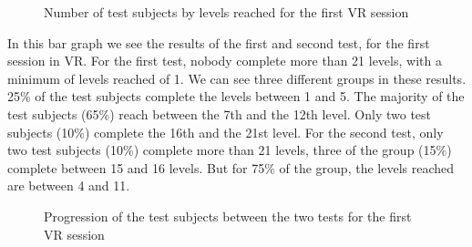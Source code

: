 \documentclass[12pt, openany, twocolumn]{article}
\begin{document}
                \begin{figure}[H]
                    \setlength{\fboxsep}{0pt}
                    \setlength{\fboxrule}{1pt}
                    \caption{Number of test subjects by levels reached for the first VR session}
                \end{figure}

            In this bar graph we see the results of the first and second test, for the first session in VR.
            For the first test, nobody complete more than 21 levels, with a minimum of levels reached of 1.
            We can see three different groups in these results.
            25\% of the test subjects complete the levels between 1 and 5.
            The majority of the test subjects (65\%) reach between the 7th and the 12th level.
            Only two test subjects (10\%) complete the 16th and the 21st level.
            For the second test, only two test subjects (10\%) complete more than 21 levels, three of the group (15\%) complete between 15 and 16 levels. 
            But for 75\% of the group, the levels reached are between 4 and 11.
            \\

                \begin{figure}[H]
                    \setlength{\fboxsep}{0pt}
                    \setlength{\fboxrule}{1pt}
                    \caption{Progression of the test subjects between the two tests for the first VR session}
                \end{figure}
\end{document}
